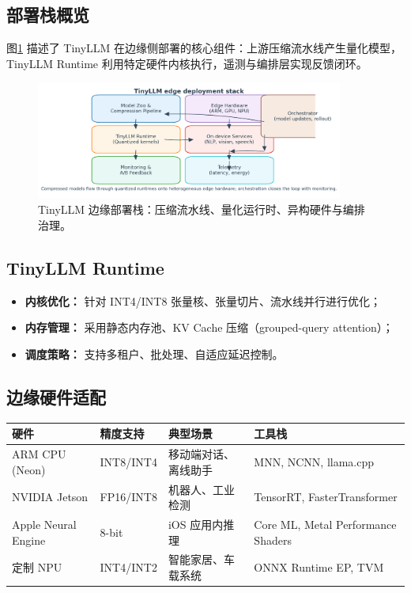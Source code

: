 \documentclass[UTF8,zihao=-4]{ctexart}
\begin{document}
\subsection{部署栈概览}
图\ref{fig:tinyllm_edge_stack_cn} 描述了 TinyLLM 在边缘侧部署的核心组件：上游压缩流水线产生量化模型，TinyLLM Runtime 利用特定硬件内核执行，遥测与编排层实现反馈闭环。
\begin{figure}[H]
  \centering
  \includegraphics[width=0.9\textwidth]{tinyllm_edge_stack.png}
\caption{TinyLLM 边缘部署栈：压缩流水线、量化运行时、异构硬件与编排治理。}
  \label{fig:tinyllm_edge_stack_cn}
\end{figure}

\subsection{TinyLLM Runtime}
\begin{itemize}
  \item \textbf{内核优化：} 针对 INT4/INT8 张量核、张量切片、流水线并行进行优化；
  \item \textbf{内存管理：} 采用静态内存池、KV Cache 压缩（grouped-query attention）；
  \item \textbf{调度策略：} 支持多租户、批处理、自适应延迟控制。
\end{itemize}

\subsection{边缘硬件适配}
\begin{longtable}{p{3cm}p{3cm}p{4cm}p{4cm}}
\toprule
硬件 & 精度支持 & 典型场景 & 工具栈 \\
\midrule
ARM CPU (Neon) & INT8/INT4 & 移动端对话、离线助手 & MNN, NCNN, llama.cpp \\
NVIDIA Jetson & FP16/INT8 & 机器人、工业检测 & TensorRT, FasterTransformer \\
Apple Neural Engine & 8-bit & iOS 应用内推理 & Core ML, Metal Performance Shaders \\
定制 NPU & INT4/INT2 & 智能家居、车载系统 & ONNX Runtime EP, TVM \\
\bottomrule
\end{longtable}
\end{document}
